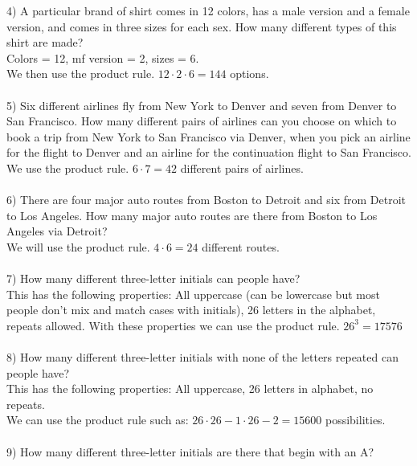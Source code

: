 \documentclass{article}
\begin{document}
\begin{flushleft}
\setlength\parindent{0pt}4) A particular brand of shirt comes in 12 colors, has a male version and a female version, and comes in three sizes for each sex.  How many different types of this shirt are made? \\
\setlength\parindent{24pt}Colors = 12, mf version = 2, sizes = 6. \\
\setlength\parindent{24pt}We then use the product rule.  $12 \cdot 2 \cdot 6 = 144$ options. \\
~\\
\setlength\parindent{0pt}5) Six different airlines fly from New York to Denver and seven from Denver to San Francisco.  How many different pairs of airlines can you choose on which to book a trip from New York to San Francisco via Denver, when you pick an airline for the flight to Denver and an airline for the continuation flight to San Francisco. \\
\setlength\parindent{24pt}We use the product rule.  $6 \cdot 7 = 42$ different pairs of airlines. \\
~\\
\setlength\parindent{0pt}6) There are four major auto routes from Boston to Detroit and six from Detroit to Los Angeles.  How many major auto routes are there from Boston to Los Angeles via Detroit? \\
\setlength\parindent{24pt}We will use the product rule.  $4 \cdot 6 = 24$ different routes. \\
~\\
\setlength\parindent{0pt}7) How many different three-letter initials can people have? \\
\setlength\parindent{24pt}This has the following properties: All uppercase (can be lowercase but most people don't mix and match cases with initials), 26 letters in the alphabet, repeats allowed.  With these properties we can use the product rule.  $26^3 = 17576$ \\
~\\
\setlength\parindent{0pt}8) How many different three-letter initials with none of the letters repeated can people have? \\
\setlength\parindent{24pt}This has the following properties: All uppercase, 26 letters in alphabet, no repeats. \\
\setlength\parindent{24pt}We can use the product rule such as: $26 \cdot 26-1 \cdot 26-2 = 15600$ possibilities. \\
~\\
\setlength\parindent{0pt}9) How many different three-letter initials are there that begin with an A? \\

\end{flushleft}
\end{document}
